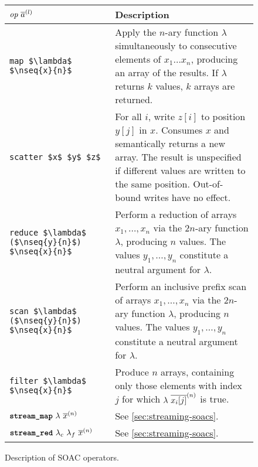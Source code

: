 \begin{figure}
  \centering
\begin{tabular}{lp{80mm}}
  $\emph{op}~\overline{a}^{(l)}$ & Description \\ \hline
  \lstinline[mathescape]!map $\lambda$ $\nseq{x}{n}$! & Apply the $n$-ary function $\lambda$ simultaneously to consecutive elements of $x_{1}\ldots{}x_{n}$, producing an array of the results.  If $\lambda$ returns $k$ values, $k$ arrays are returned. \\
  \lstinline[mathescape]!scatter $x$ $y$ $z$! & For all $i$, write $z[i]$ to position $y[j]$ in $x$.  Consumes $x$ and semantically returns a new array.  The result is unspecified if different values are written to the same position.  Out-of-bound writes have no effect. \\
  \lstinline[mathescape]!reduce $\lambda$ ($\nseq{y}{n}$) $\nseq{x}{n}$! &
                                                                                               Perform a reduction of arrays $x_{1}, \ldots, x_{n}$ via the $2n$-ary function $\lambda$, producing $n$ values.  The values $y_{1}, \ldots, y_{n}$ constitute a neutral argument for $\lambda$.
  \\
  \lstinline[mathescape]!scan $\lambda$ ($\nseq{y}{n}$) $\nseq{x}{n}$! &
                                                                                             Perform an inclusive prefix scan of arrays $x_{1}, \ldots, x_{n}$ via the $2n$-ary function $\lambda$, producing $n$ values.  The values $y_{1}, \ldots, y_{n}$ constitute a neutral argument for $\lambda$. \\
  \lstinline[mathescape]!filter $\lambda$ $\nseq{x}{n}$! &
                                                                      Produce $n$ arrays, containing only those elements with index $j$ for which $\lambda~\overline{x_{i}[j]}^{(n)}$ is true. \\
  $\mbox{\texttt{\bfseries{stream\_map}}}~\lambda~\overline{x}^{(n)}$ & See \cref{sec:streaming-soacs}. \\
  $\mbox{\texttt{\bfseries{stream\_red}}}~\lambda_{c}~\lambda_{f}~\overline{x}^{(n)}$ & See \cref{sec:streaming-soacs}. \\
\end{tabular}
\caption{Description of SOAC operators.}
\label{fig:soacDesc}
\end{figure}


